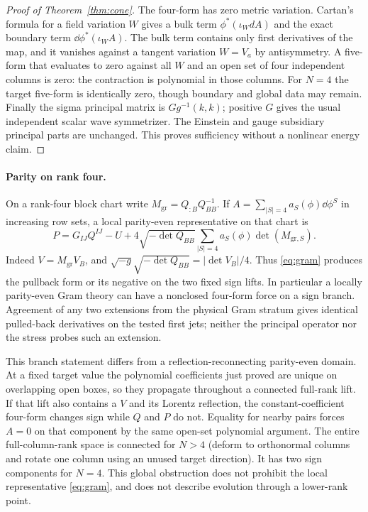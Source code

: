 \begin{proof}[Proof of Theorem~\ref{thm:cone}]
The four-form has zero metric variation. Cartan's formula for a field variation \(W\) gives a bulk term \(\phi^*(\iota_WdA)\) and the exact boundary term \(\dd\phi^*(\iota_WA)\). The bulk term contains only first derivatives of the map, and it vanishes against a tangent variation \(W=V_a\) by antisymmetry. A five-form that evaluates to zero against all \(W\) and an open set of four independent columns is zero: the contraction is polynomial in those columns. For \(N=4\) the target five-form is identically zero, though boundary and global data may remain. Finally the sigma principal matrix is \(Gg^{-1}(k,k)\); positive \(G\) gives the usual independent scalar wave symmetrizer. The Einstein and gauge subsidiary principal parts are unchanged. This proves sufficiency without a nonlinear energy claim.
\end{proof}

\paragraph{Parity on rank four.}
On a rank-four block chart write \(M_{\mathrm{gr}}=Q_{:B}Q_{BB}^{-1}\). If \(A=\sum_{|S|=4}a_S(\phi)\dd\phi^S\) in increasing row sets, a local parity-even representative on that chart is
\begin{equation}\label{eq:gram}
 P=G_{IJ}Q^{IJ}-U+
 4\sqrt{-\det Q_{BB}}\sum_{|S|=4}a_S(\phi)\det(M_{\mathrm{gr},S}).
\end{equation}
Indeed \(V=M_{\mathrm{gr}}V_B\), and
\(\sqrt{-g}\sqrt{-\det Q_{BB}}=|\det V_B|/4\).
Thus \eqref{eq:gram} produces the pullback form or its negative on the two fixed sign lifts. In particular a locally parity-even Gram theory can have a nonclosed four-form force on a sign branch. Agreement of any two extensions from the physical Gram stratum gives identical pulled-back derivatives on the tested first jets; neither the principal operator nor the stress probes such an extension.

This branch statement differs from a reflection-reconnecting parity-even domain. At a fixed target value the polynomial coefficients just proved are unique on overlapping open boxes, so they propagate throughout a connected full-rank lift. If that lift also contains a \(V\) and its Lorentz reflection, the constant-coefficient four-form changes sign while \(Q\) and \(P\) do not. Equality for nearby pairs forces \(A=0\) on that component by the same open-set polynomial argument. The entire full-column-rank space is connected for \(N>4\) (deform to orthonormal columns and rotate one column using an unused target direction). It has two sign components for \(N=4\). This global obstruction does not prohibit the local representative \eqref{eq:gram}, and does not describe evolution through a lower-rank point.
